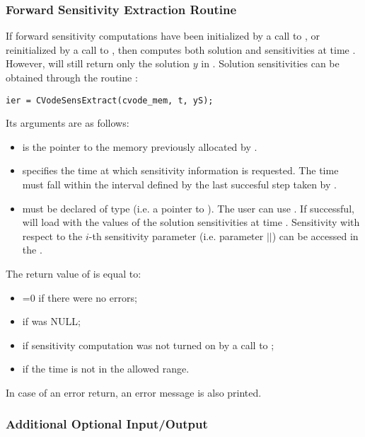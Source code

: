 \subsubsection{Forward Sensitivity Extraction Routine}\label{sss:cvodesensextract}

If forward sensitivity computations have been initialized by a call to ,
or reinitialized by a call to , then {\cvodes} computes both solution
and sensitivities at time . However,  will still return only the solution
$y$ in . Solution sensitivities can be obtained through the routine
:
\begin{verbatim}
ier = CVodeSensExtract(cvode_mem, t, yS);
\end{verbatim}
Its arguments are as follows:
\begin{itemize}
\item {} is the pointer to the memory previously allocated
  by .
\item {} specifies the time at which sensitivity information is 
  requested. The time  must fall within the interval defined by the last 
  succesful step taken by {\cvodes}.
\item {} must be declared of type  (i.e. a pointer to 
  ). The user can use . 
  If successful,  will load  with the values of the
  solution sensitivities at time . Sensitivity with respect to the $i$-th
  sensitivity parameter (i.e. parameter \id{p[}$|$$|$\id{-1]}) can be accessed in
  the  .
\end{itemize}
The return value  of  is equal to: 
\begin{itemize}
\item {}=0 if there were no errors; 
\item {} if  was NULL;
\item {} if sensitivity computation was not turned on
      by a call to ;
\item {} if the time  is not in the allowed range.
\end{itemize}
In case of an error return, an error message is also printed.  

\subsubsection{Additional Optional Input/Output}\label{sss:more_optional_io}

